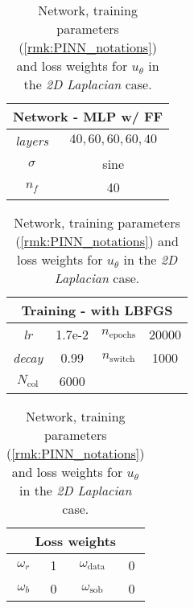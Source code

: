 \begin{table}[htbp]
    \centering
    \begin{tabular}{cc}
        \toprule
        \multicolumn{2}{c}{\textbf{Network - MLP w/ FF}} \\
        \midrule
        \textit{layers} & $40,60,60,60,40$ \\
        \cmidrule(lr){1-2}
        $\sigma$ & sine \\
        \cmidrule(lr){1-2}
        $n_f$ & 40 \\
        \bottomrule
    \end{tabular}
    \hspace{1cm}
    \begin{tabular}{cccc}
        \toprule
        \multicolumn{4}{c}{\textbf{Training - with LBFGS}} \\
        \midrule
        \textit{lr} & 1.7e-2 & $n_\text{epochs}$ & 20000 \\
        \cmidrule(lr){1-2} \cmidrule(lr){3-4}
        \textit{decay} & 0.99 & $n_\text{switch}$ & 1000 \\
        \cmidrule(lr){1-2} \cmidrule(lr){3-4}
        $N_\text{col}$ & 6000 \\
        \bottomrule
    \end{tabular}
    \hspace{1cm}
    \begin{tabular}{cccc}
        \toprule
        \multicolumn{4}{c}{\textbf{Loss weights}} \\
        \midrule
        $\omega_r$ & 1 & $\omega_\text{data}$ & 0 \\
        \cmidrule(lr){1-2} \cmidrule(lr){3-4}
        $\omega_b$ & 0 & $\omega_\text{sob}$ & 0 \\        
        \bottomrule
    \end{tabular}
    \caption{Network, training parameters (\cref{rmk:PINN_notations}) and loss weights for $u_\theta$ in the \textit{2D Laplacian} case.}
    \label{tab:paramtest2_2D}
\end{table}

